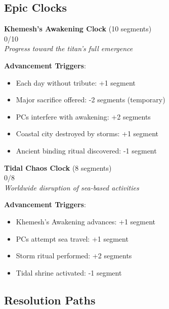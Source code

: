 \documentclass[11pt]{article}
\newcommand{\clocksegment}{\textbullet}
\begin{document}
\subsection*{Epic Clocks}

\begin{center}
\textbf{Khemesh's Awakening Clock} (10 segments)\\
\fbox{\clocksegment\clocksegment\clocksegment\clocksegment\clocksegment\clocksegment\clocksegment\clocksegment\clocksegment\clocksegment} 0/10\\
\textit{Progress toward the titan's full emergence}
\end{center}

\textbf{Advancement Triggers}:
\begin{itemize}[leftmargin=*]
\item Each day without tribute: +1 segment
\item Major sacrifice offered: -2 segments (temporary)
\item PCs interfere with awakening: +2 segments
\item Coastal city destroyed by storms: +1 segment
\item Ancient binding ritual discovered: -1 segment
\end{itemize}

\begin{center}
\textbf{Tidal Chaos Clock} (8 segments)\\
\fbox{\clocksegment\clocksegment\clocksegment\clocksegment\clocksegment\clocksegment\clocksegment\clocksegment} 0/8\\
\textit{Worldwide disruption of sea-based activities}
\end{center}

\textbf{Advancement Triggers}:
\begin{itemize}[leftmargin=*]
\item Khemesh's Awakening advances: +1 segment
\item PCs attempt sea travel: +1 segment
\item Storm ritual performed: +2 segments
\item Tidal shrine activated: -1 segment
\end{itemize}

\subsection*{Resolution Paths}
\end{document}
